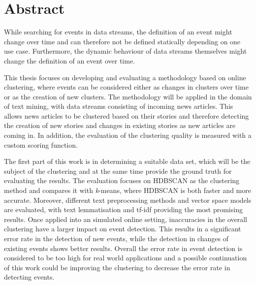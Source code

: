 
\section*{Abstract}


While searching for events in data streams, the definition of an event might change over time and can therefore not be defined statically depending on one use case. Furthermore, the dynamic behaviour of data streams themselves might change the definition of an event over time.

This thesis focuses on developing and evaluating a methodology based on online clustering, where events can be considered either as changes in clusters over time or as the creation of new clusters. The methodology will be applied in the domain of text mining, with data streams consisting of incoming news articles. This allows news articles to be clustered based on their stories and therefore detecting the creation of new stories and changes in existing stories as new  articles are coming in. In addition, the evaluation of the clustering quality is measured with a custom scoring function.

The first part of this work is in determining a suitable data set, which will be the subject of the clustering and at the same time provide the ground truth for evaluating the results. The evaluation focuses on HDBSCAN as the clustering method and compares it with \textit{k}-means, where HDBSCAN is both faster and more accurate. Moreover, different text preprocessing methods and vector space models are evaluated, with text lemmatisation and tf-idf providing the most promising results. Once applied into an simulated online setting, inaccuracies in the overall clustering have a larger impact on event detection. This results in a significant error rate in the detection of new events, while the detection in changes of existing events shows better results. Overall the error rate in event detection is considered to be too high for real world applications and a possible continuation of this work could be improving the clustering to decrease the error rate in detecting events.



